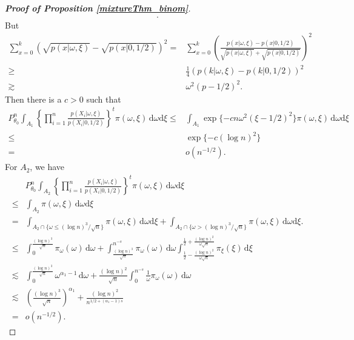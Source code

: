 \documentclass[11pt]{article}
\theoremstyle{plain}
\theoremstyle{definition}
\theoremstyle{remark}
\begin{document}
\begin{appendices}
\begin{proof}[\textbf{Proof of Proposition \ref{mixtureThm_binom}}]
\begin{align*}
.
\end{align*}
But
\begin{align*}
    \sum_{x=0}^k \left(\sqrt{p( x |\omega, \xi) }-\sqrt{p( x |0, 1/2  )}\right)^2 
=&
\sum_{x=0}^k \left(\frac{{p( x |\omega,\xi) }-{p( x |0, 1/2  )}}{\sqrt{p( x |\omega, \xi) }+\sqrt{p( x |0, 1/2  )}}\right)^2 
\\
\geq&
\frac{1}{4}
 \left({p( k |\omega, \xi) }-{p( k |0, 1/2 )}\right)^2 
\\
\gtrsim&
\omega^2
\left( p - 1/2 \right)^2 
.
\end{align*}
Then there is a $c>0$ such that
\begin{equation*}
    \begin{split}
        P^n_{\theta_0} \int_{A_1} \left\{\prod_{i=1}^n \frac{p(X_i|\omega, \xi)}{p(X_i|0, 1/2 )}\right\}^t \pi(\omega, \xi)\, \mathrm d\omega \mathrm d \xi
    \leq &
    \int_{A_1} 
    \exp\{ - c n \omega^2 \left( \xi - 1/2 \right)^2 \}
    \pi(\omega, \xi)\, \mathrm d\omega \mathrm d \xi
    \\
    \leq &
    \exp\{ - c (\log n)^2 \}
    \\
    = &
    o(n^{-1/2})
    .
    \end{split}
\end{equation*}
For $A_2$, we have
\begin{equation*}
    \begin{split}
        &
        P^n_{\theta_0} \int_{A_2} \left\{\prod_{i=1}^n \frac{p(X_i|\omega, \xi)}{p(X_i|0, 1/2 )}\right\}^t \pi(\omega, \xi)\, \mathrm d\omega \mathrm d \xi
        \\
    \leq&
    \int_{A_2}  \pi(\omega, \xi)\, \mathrm d\omega \mathrm d \xi
    \\
    =&
    \int_{A_2\cap\{\omega\leq  (\log n)^3 / \sqrt n\}}  \pi(\omega, \xi)\, \mathrm d\omega \mathrm d \xi
    +
    \int_{A_2\cap\{\omega>  (\log n)^3 / \sqrt n\}}  \pi(\omega, \xi)\, \mathrm d\omega \mathrm d \xi
    .
    \\
    \leq&
    \int_{0}^{ \frac{ (\log n)^3}{\sqrt n}} \pi_\omega(\omega)  \, \mathrm d\omega
    +
    \int_{\frac{(\log n)^3}{\sqrt n}}^{n^{-s}} \pi_\omega(\omega)  \, \mathrm d\omega
    \int_{\frac 1 2 - \frac{(\log n)^2}{\omega \sqrt n}}^{\frac 1 2 + \frac{(\log n)^2}{\omega \sqrt n}}
    \pi_\xi (\xi)\, \mathrm d \xi
    \\
    \lesssim &
    \int_{0}^{ \frac{ (\log n)^3}{\sqrt n}} \omega^{\alpha_1 - 1 } \, \mathrm d\omega
    +
\frac{(\log n)^2}{ \sqrt n}
\int_{0}^{n^{-s}} \frac{1}{\omega} \pi_\omega(\omega)  \, \mathrm d\omega
    \\
    \lesssim &
    \left({ \frac{ (\log n)^3}{\sqrt n}}\right)^{\alpha_1}
    +
    \frac{(\log n)^2}{ n^{1/2+(\alpha_1 - 1)s}}
    \\
    =& o(n^{-1/2})
    .
    \end{split}
\end{equation*}


\end{proof}
\end{appendices}
\end{document}
